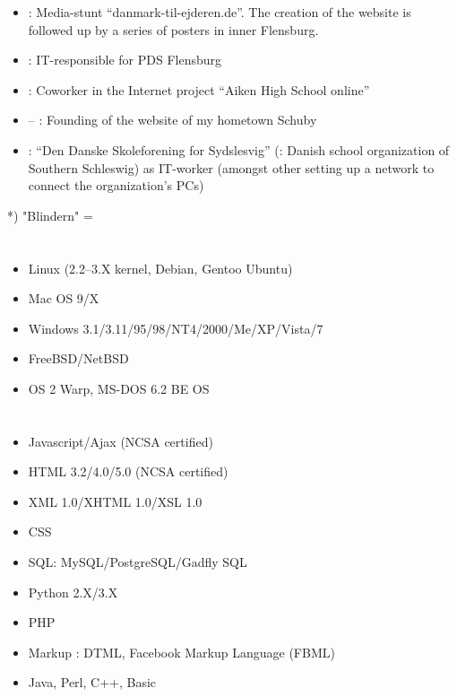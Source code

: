 \begin{itemize}
\item {}: Media-stunt “danmark-til-ejderen.de”. The creation of the website is followed up by a series of posters in inner Flensburg.
\item {}: IT-responsible for PDS Flensburg
\item {}: Coworker in the Internet project “Aiken High School online”
\item {} – : Founding of the website of my hometown Schuby
\item {}: “Den Danske Skoleforening for Sydslesvig” (\english: Danish school organization of Southern Schleswig) as IT-worker (amongst other setting up a network to connect the organization's PCs)


\end{itemize}



*) "Blindern" = \uio


\section*{\ITsystems}

\begin{itemize}
\item Linux (2.2–3.X kernel, Debian, Gentoo \und Ubuntu)
\item Mac OS 9/X
\item Windows 3.1/3.11/95/98/NT4/2000/Me/XP/Vista/7
\item FreeBSD/NetBSD
\item OS 2 Warp, MS-DOS 6.2 \und BE OS
\end{itemize}

\section*{\ITlanguages}

\begin{itemize}
\item Javascript/Ajax (NCSA certified)
\item HTML 3.2/4.0/5.0 (NCSA certified)
\item XML 1.0/XHTML 1.0/XSL 1.0
\item CSS
\item SQL:  MySQL/PostgreSQL/Gadfly SQL
\item Python 2.X/3.X
\item PHP
\item Markup \languages: DTML, Facebook Markup Language (FBML)
\item \basic Java, Perl, C++, Basic
\end{itemize}

